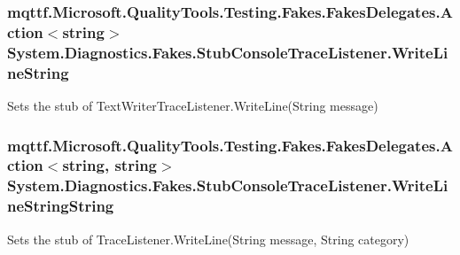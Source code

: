 \hypertarget{class_system_1_1_diagnostics_1_1_fakes_1_1_stub_console_trace_listener_adfd7c795a096ce28ed650c39c929baee}{
\subsubsection[{Write\-Line\-String}]{\setlength{\rightskip}{0pt plus 5cm}mqttf.\-Microsoft.\-Quality\-Tools.\-Testing.\-Fakes.\-Fakes\-Delegates.\-Action$<$string$>$ System.\-Diagnostics.\-Fakes.\-Stub\-Console\-Trace\-Listener.\-Write\-Line\-String}}\label{class_system_1_1_diagnostics_1_1_fakes_1_1_stub_console_trace_listener_adfd7c795a096ce28ed650c39c929baee}


Sets the stub of Text\-Writer\-Trace\-Listener.\-Write\-Line(\-String message)

\hypertarget{class_system_1_1_diagnostics_1_1_fakes_1_1_stub_console_trace_listener_a52bbf798dca2c40a21c459990e397b9e}{
\subsubsection[{Write\-Line\-String\-String}]{\setlength{\rightskip}{0pt plus 5cm}mqttf.\-Microsoft.\-Quality\-Tools.\-Testing.\-Fakes.\-Fakes\-Delegates.\-Action$<$string, string$>$ System.\-Diagnostics.\-Fakes.\-Stub\-Console\-Trace\-Listener.\-Write\-Line\-String\-String}}\label{class_system_1_1_diagnostics_1_1_fakes_1_1_stub_console_trace_listener_a52bbf798dca2c40a21c459990e397b9e}


Sets the stub of Trace\-Listener.\-Write\-Line(\-String message, String category)

